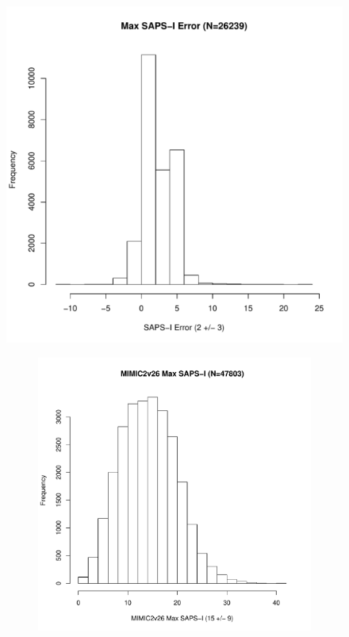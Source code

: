 \documentclass[10pt]{article}
\begin{document}
\begin{figure}
\includegraphics[width=0.45\linewidth]{../../figure/fig_hist_sapsi_max_err.pdf}
\end{figure}

\begin{figure}
        \begin{subfigure}[b]{0.5\textwidth}
                \includegraphics[width=\linewidth]{../../figure/fig_hist_sapsi_max_mimic2v26.pdf}
        \end{subfigure}%
        \begin{subfigure}[b]{0.5\textwidth}

\end{subfigure}
\end{figure}
\end{document}
